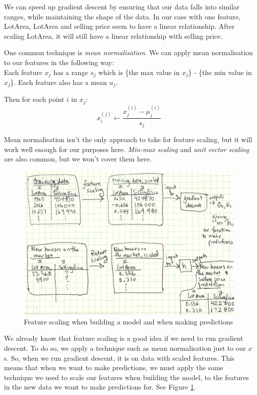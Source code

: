 \documentclass[11pt]{article}
\begin{document}
    We can speed up gradient descent by ensuring that our data falls into similar ranges, while maintaining the shape of the data. In our case with one feature, LotArea, LotArea and selling price seem to have a linear relationship. After scaling LotArea, it will still have a linear relationship with selling price. 

    One common technique is \textit{mean normalisation}. We can apply mean normalisation to our features in the following way: \\
    
    Each feature $x_j$ has a range $s_j$ which is \{the max value in $x_j$\} - \{the min value in $x_j$\}. Each feature also has a mean $u_j$.
    
    Then for each point $i$ in $x_j$:
    \[
        x_i^{(j)} \leftarrow \frac{x_j^{(i)} - \mu_j^{(i)}}{s_j}
    \]
    
    Mean normalisation isn't the only approach to take for feature scaling, but it will work well enough for our purposes here. \textit{Min-max scaling} and \textit{unit vector scaling} are also common, but we won't cover them here. 
    
    
    \begin{figure}
        \includegraphics[width=\textwidth]{feature-scaling-data}
        \caption{Feature scaling when building a model and when making predictions }
        \label{fig:feature-scaling-data}
    \end{figure}
    
    We already know that feature scaling is a good idea if we need to run gradient descent. To do so, we apply a technique such as mean normalisation just to our $x$s.  So, when we run gradient descent, it is on data with scaled features. This means that when we want to make predictions, we must apply the same technique we used to scale our features when building the model, to the features in the new data we want to make predictions for. See Figure \ref{fig:feature-scaling-data}.
    
\end{document}
